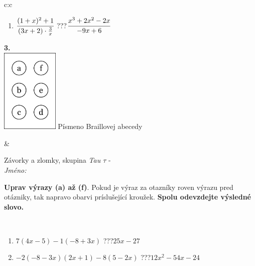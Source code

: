 \documentclass[10pt]{report}
\begin{document}
\begin{tabular}{c:c}
\begin{minipage}[c][104.5mm][t]{0.5\linewidth}
\begin{center}
\begin{minipage}{0.79\linewidth}
\begin{center}
\begin{varwidth}{\linewidth}
\begin{enumerate}
\item $\cfrac{(1+x)^2+1}{(3x+2)\cdot\frac{3}{x}}$\quad \dotfill\; ???\;\dotfill \quad $\cfrac{x^3+2x^2-2x}{-9x+6}$
\end{enumerate}
\end{varwidth}
\end{center}
\end{minipage}
\begin{minipage}{0.20\linewidth}
\begin{center}
{\Huge\bfseries 3.} \\[2mm]
\includegraphics[height=40mm]{../images/braille.png}
{\small Písmeno Braillovej abecedy}
\end{center}
\end{minipage}
\end{center}
\end{minipage}
&
\begin{minipage}[c][104.5mm][t]{0.5\linewidth}
\begin{center}
\vspace{7mm}
{\huge Závorky a zlomky, skupina \textit{Tau $\tau$} -}\\[5mm]
\textit{Jméno:}\phantom{xxxxxxxxxxxxxxxxxxxxxxxxxxxxxxxxxxxxxxxxxxxxxxxxxxxxxxxxxxxxxxxxx}\\[5mm]
\begin{minipage}{0.95\linewidth}
\begin{center}
\textbf{Uprav výrazy (a) až (f)}. Pokud je výraz za otazníky roven výrazu pred otázniky, tak napravo obarvi príslušející kroužek. \textbf{Spolu odevzdejte výsledné slovo.}
\end{center}
\end{minipage}
\\[1mm]
\begin{minipage}{0.79\linewidth}
\begin{center}
\begin{varwidth}{\linewidth}
\begin{enumerate}
\normalsize
\item $7(4x-5)-1(-8+3x)$\quad \dotfill\; ???\;\dotfill \quad $25x-27$
\item $-2(-8-3x)(2x+1)-8(5-2x)$\quad \dotfill\; ???\;\dotfill \quad $12x^2-54x-24$

\end{enumerate}
\end{varwidth}
\end{center}
\end{minipage}
\end{center}
\end{minipage}
\end{tabular}
\end{document}
